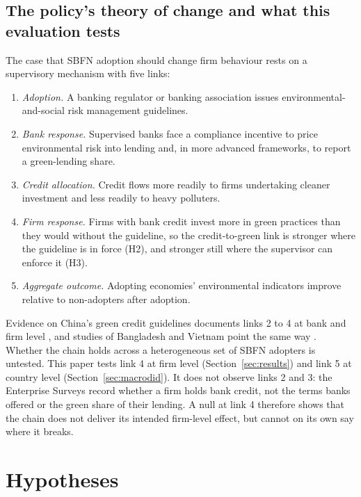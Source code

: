 \documentclass[review,authoryear,12pt]{elsarticle}
\begin{document}
\subsection{The policy's theory of change and what this evaluation tests}
\label{sec:toc}

The case that SBFN adoption should change firm behaviour rests on a supervisory mechanism with five links:

\begin{enumerate}
\item \emph{Adoption.} A banking regulator or banking association issues environmental-and-social risk management guidelines.
\item \emph{Bank response.} Supervised banks face a compliance incentive to price environmental risk into lending and, in more advanced frameworks, to report a green-lending share.
\item \emph{Credit allocation.} Credit flows more readily to firms undertaking cleaner investment and less readily to heavy polluters.
\item \emph{Firm response.} Firms with bank credit invest more in green practices than they would without the guideline, so the credit-to-green link is stronger where the guideline is in force (H2), and stronger still where the supervisor can enforce it (H3).
\item \emph{Aggregate outcome.} Adopting economies' environmental indicators improve relative to non-adopters after adoption.
\end{enumerate}

Evidence on China's green credit guidelines documents links 2 to 4 at bank and firm level \citep{dai2025,gao2022,huang2023,li2023}, and studies of Bangladesh and Vietnam point the same way \citep{khairunnessa2021,nguyen2025}. Whether the chain holds across a heterogeneous set of SBFN adopters is untested. This paper tests link 4 at firm level (Section~\ref{sec:results}) and link 5 at country level (Section~\ref{sec:macrodid}). It does not observe links 2 and 3: the Enterprise Surveys record whether a firm holds bank credit, not the terms banks offered or the green share of their lending. A null at link 4 therefore shows that the chain does not deliver its intended firm-level effect, but cannot on its own say where it breaks.

\section{Hypotheses}
\label{sec:literature}
\end{document}
